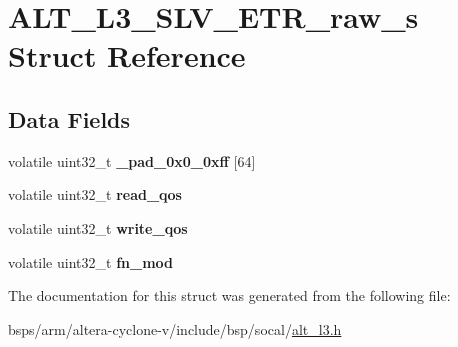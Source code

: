 \hypertarget{structALT__L3__SLV__ETR__raw__s}{}\section{A\+L\+T\+\_\+\+L3\+\_\+\+S\+L\+V\+\_\+\+E\+T\+R\+\_\+raw\+\_\+s Struct Reference}
\label{structALT__L3__SLV__ETR__raw__s}
\subsection*{Data Fields}
\begin{DoxyCompactItemize}
\item 
\mbox{\label{structALT__L3__SLV__ETR__raw__s_a20a9d20b5b093bd9ffd03f801e5b33fb}} 
volatile uint32\+\_\+t {\bfseries \+\_\+pad\+\_\+0x0\+\_\+0xff} \mbox{[}64\mbox{]}
\item 
\mbox{\label{structALT__L3__SLV__ETR__raw__s_a9ae53bd526d36fc576aa3f2ccf3f2aed}} 
volatile uint32\+\_\+t {\bfseries read\+\_\+qos}
\item 
\mbox{\label{structALT__L3__SLV__ETR__raw__s_a095d70b32f1105451d1a3f8edaacf517}} 
volatile uint32\+\_\+t {\bfseries write\+\_\+qos}
\item 
\mbox{\label{structALT__L3__SLV__ETR__raw__s_a266088240b60c5f914ca812d9daba3a0}} 
volatile uint32\+\_\+t {\bfseries fn\+\_\+mod}
\end{DoxyCompactItemize}


The documentation for this struct was generated from the following file\+:\begin{DoxyCompactItemize}
\item 
bsps/arm/altera-\/cyclone-\/v/include/bsp/socal/\mbox{\hyperlink{alt__l3_8h}{alt\+\_\+l3.\+h}}\end{DoxyCompactItemize}
